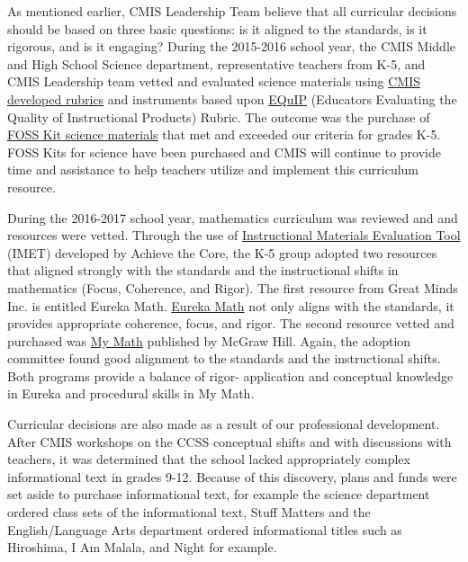 \begin{findings}

As mentioned earlier, CMIS Leadership Team believe that all curricular decisions should be based on three basic questions: is it aligned to the standards, is it rigorous, and is it engaging? During the 2015-2016 school year, the CMIS Middle and High School Science department, representative teachers from K-5, and CMIS Leadership team vetted and evaluated science materials using \href{https://docs.google.com/a/cmis.ac.th/document/d/1u0crwv2uVJdfamGYP9NYsUvub7bkPO64dIu0uAAkSIo/edit?usp=sharing}{CMIS developed rubrics} and instruments based upon \href{https://drive.google.com/a/cmis.ac.th/file/d/0ByVFfrm0zfolWmtFbld4MExkdGc/view?usp=sharing}{EQuIP} (Educators Evaluating the Quality of Instructional Products) Rubric. The outcome was the purchase of \href{https://drive.google.com/drive/folders/0ByVFfrm0zfolVERNZUJiX2pYNjA?usp=sharing}{FOSS Kit science materials} that met and exceeded our criteria for grades K-5. FOSS Kits for science have been purchased and CMIS will continue to provide time and assistance to help teachers utilize and implement this curriculum resource. 

During the 2016-2017 school year, mathematics curriculum was reviewed and and resources were vetted. Through the use of \href{https://drive.google.com/drive/folders/0ByVFfrm0zfolWHVZRlNuYWppWGM?usp=sharing}{Instructional Materials Evaluation Tool} (IMET) developed by Achieve the Core, the K-5 group adopted two resources that aligned strongly with the standards and the instructional shifts in mathematics (Focus, Coherence, and Rigor). The first resource from Great Minds Inc. is entitled Eureka Math. \href{https://greatminds.org/math}{Eureka Math} not only aligns with the standards, it provides appropriate coherence, focus, and rigor. The second resource vetted and purchased was \href{http://help.k12.mhedu.com/connected/}{My Math} published by McGraw Hill. Again, the adoption committee  found good alignment to the standards and the instructional shifts. Both programs provide a balance of rigor- application and conceptual knowledge in Eureka and procedural skills in My Math. 

Curricular decisions are also made as a result of our professional development.  After CMIS workshops on the CCSS conceptual shifts and with discussions with teachers, it was determined that the school lacked appropriately complex informational text in grades 9-12. Because of this discovery, plans and funds were set aside to purchase informational text, for example the science department ordered class sets of the informational text, Stuff Matters and the English/Language Arts department ordered informational titles such as Hiroshima, I Am Malala, and Night for example. 


\end{findings}
